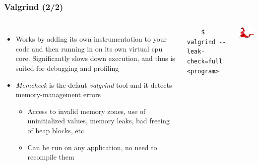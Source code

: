 \begin{frame}[fragile]
  \frametitle{Valgrind (2/2)}
  \begin{columns}[T]
    \begin{itemize}
      \item Works by adding its own instrumentation to your code and
            then running in on its own virtual cpu core. Significantly slows
            down execution, and thus is suited for debugging and profiling
      \item {\em Memcheck} is the defaut {\em valgrind} tool and it detects
            memory-management errors
      \begin{itemize}
        \item Access to invalid memory zones, use of uninitialized values,
              memory leaks, bad freeing of heap blocks, etc
        \item Can be run on any application, no need to recompile them
      \end{itemize}
    \end{itemize}
      \begin{block}{}
        \begin{verbatim}
    $ valgrind --leak-check=full <program>
        \end{verbatim}
      \end{block}
    \includegraphics[width=\textwidth]{../common/valgrind2.png}
  \end{columns}
\end{frame}

